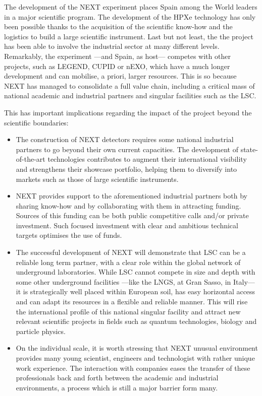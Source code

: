 The development of the NEXT experiment places Spain among the World leaders in a major scientific program. The development of the HPXe technology has only been possible thanks to the acquisition of the scientific know-how and the logistics to build a large scientific instrument. Last but not least, the the project has been able to involve the industrial sector at many different levels. Remarkably, the experiment ---and Spain, as host--- competes with other projects, such as LEGEND, CUPID or nEXO, which have a much longer development and can mobilise, a priori, larger resources. This is so because NEXT has managed to consolidate a full value chain, including a critical mass of national academic and industrial partners and singular facilities such as the LSC.  

This has important implications regarding the impact of the project beyond the scientific boundaries:
\begin{itemize}[noitemsep,topsep=0pt,parsep=0pt,partopsep=0pt]
\item The construction of NEXT detectors requires some national industrial partners to go beyond their own current capacities. The development of state-of-the-art technologies contributes to augment their international visibility and strengthens their showcase portfolio, helping them to diversify into markets such as those of large scientific instruments. 
\item  NEXT provides support to the aforementioned industrial partners both by sharing know-how and by collaborating with them in attracting funding. Sources of this funding can be both public competitive calls and/or private investment. Such focused investment with clear and ambitious technical targets optimises the use of funds.  
\item The successful development of NEXT will demonstrate that LSC can be a reliable long term partner, with a clear role within the global network of underground laboratories. While LSC cannot compete in size and depth with some other underground facilities ---like the LNGS, at Gran Sasso, in Italy--- it is strategically well placed within European soil, has easy horizontal access and can adapt its resources in a flexible and reliable manner. This will rise the international profile of this national singular facility and attract new relevant scientific projects in fields such as quantum technologies, biology and particle physics. 
\item On the individual scale, it is worth stressing that NEXT unusual environment provides many young scientist, engineers and technologist with rather unique work experience. The interaction with companies eases the transfer of these professionals back and forth  between the academic and industrial environments, a process which is still a major barrier form many. 
\end{itemize}

